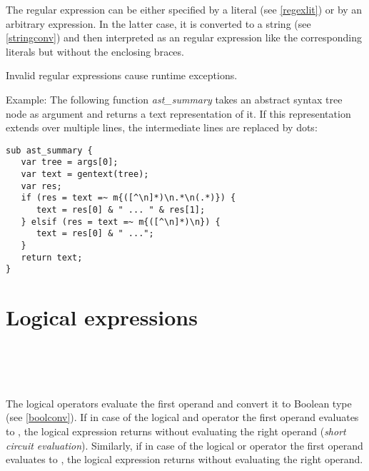 The regular expression can be either specified by a literal
(see \ref{regexlit}) or by an arbitrary expression. In the latter
case, it is converted to a string (see \ref{stringconv}) and
then interpreted as an regular expression like the corresponding
literals but without the enclosing braces.

Invalid regular expressions cause runtime exceptions.

Example: The following function \textit{ast\_summary} takes
an abstract syntax tree node as argument and returns a
text representation of it. If this representation extends over
multiple lines, the intermediate lines are replaced by dots:

\begin{lstlisting}
sub ast_summary {
   var tree = args[0];
   var text = gentext(tree);
   var res;
   if (res = text =~ m{([^\n]*)\n.*\n(.*)}) {
      text = res[0] & " ... " & res[1];
   } elsif (res = text =~ m{([^\n]*)\n}) {
      text = res[0] & " ...";
   }
   return text;
}
\end{lstlisting}

\section{Logical expressions}

\begin{grammar}
      \produces {} \\
      \produces {}
         \lextoken{\&\&}  \\
      \produces {} \\
      \produces {}
         \lextoken{\barSY\barSY} 
\end{grammar}

\noindent
The logical operators evaluate the first operand and convert
it to Boolean type (see \ref{boolconv}). If in case of the
logical and operator \token{\&\&} the first operand evaluates
to , the logical expression returns 
without evaluating the right operand (\textit{short circuit
evaluation}). Similarly, if
in case of the logical or operator \token{\barSY\barSY} the
first operand evaluates to , the logical expression
returns  without evaluating the right operand.

